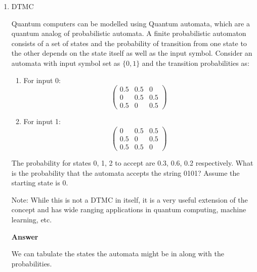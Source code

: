 \documentclass[12pt, oneside]{article}
\begin{document}
\begin{enumerate}
\item {
    DTMC

    Quantum computers can be modelled using Quantum automata, which are a quantum analog
    of probabilistic automata. A finite probabilistic automaton consists of a set of states
    and the probability of transition from one state to the other depends on the state itself
    as well as the input symbol. Consider an automata with input symbol set as \(\{0, 1\}\)
    and the transition probabilities as:
    \begin{enumerate}
        \item {
            For input 0:
            \[\begin{pmatrix}
                0.5 & 0.5 & 0 \\
                0 & 0.5 & 0.5 \\
                0.5 & 0 & 0.5
            \end{pmatrix}\]
        }
        \item {
            For input 1:
            \[\begin{pmatrix}
                0 & 0.5 & 0.5 \\
                0.5 & 0 & 0.5 \\
                0.5 & 0.5 & 0
            \end{pmatrix}\]
        }
    \end{enumerate}
    The probability for states 0, 1, 2 to accept are 0.3, 0.6, 0.2 respectively.
    What is the probability that the automata accepts the string 0101? Assume the starting
    state is 0.

    Note: While this is not a DTMC in itself, it is a very useful extension of the 
    concept and has wide ranging applications in quantum computing, machine learning, etc.

    \textbf{Answer}

    We can tabulate the states the automata might be in along with the probabilities.

}
\end{enumerate}
\end{document}
